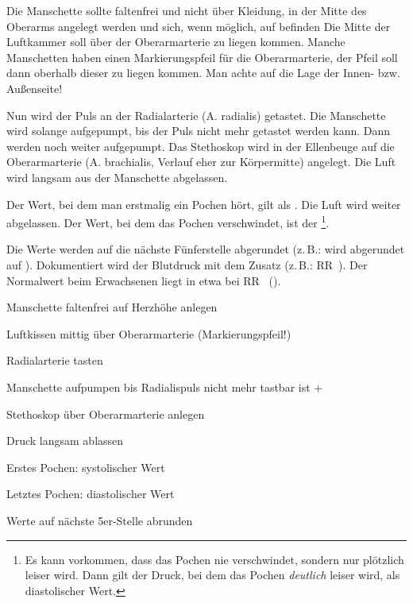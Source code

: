 {%
Die Manschette sollte faltenfrei und nicht über Kleidung, in
der Mitte des Oberarms angelegt werden und sich, wenn
möglich, auf  befinden Die Mitte der Luftkammer soll
über der Oberarmarterie zu liegen kommen. Manche Manschetten
haben einen Markierungspfeil für die Oberarmarterie, der
Pfeil soll dann oberhalb dieser zu liegen kommen. Man achte
auf die Lage der Innen- bzw. Außenseite!

Nun wird der Puls an der Radialarterie (A. radialis)
getastet. Die Manschette wird solange aufgepumpt, bis der
Puls nicht mehr getastet werden kann. Dann werden noch
\MmHg* weiter aufgepumpt. Das Stethoskop wird
in der Ellenbeuge auf die Oberarmarterie (A. brachialis,
Verlauf eher zur Körpermitte) angelegt. Die Luft wird
langsam aus der Manschette abgelassen.

Der Wert, bei dem man erstmalig ein Pochen  hört, gilt als . Die Luft
wird weiter abgelassen. Der Wert, bei dem das Pochen
verschwindet, ist der \footnote{Es
kann vorkommen, dass das Pochen nie verschwindet, sondern
nur plötzlich leiser wird. Dann gilt der Druck, bei dem das
Pochen \emph{deutlich} leiser wird, als diastolischer
Wert.}. \cite{FamPropAeGruFert2012}

Die
Werte werden auf die nächste Fünferstelle abgerundet
(z.\,B.:
 wird abgerundet auf ).
Dokumentiert wird der Blutdruck mit dem Zusatz  (z.\,B.:
RR~). Der Normalwert beim Erwachsenen liegt
in etwa bei RR~
().
}{
\begin{compactenum}
  \item Manschette faltenfrei auf Herzhöhe anlegen
  \item Luftkissen  mittig über Oberarmarterie
  (Markierungspfeil!)
  \item Radialarterie tasten
  \item Manschette aufpumpen bis Radialispuls nicht mehr
  tastbar ist +~\,\MmHg
  \item Stethoskop über Oberarmarterie anlegen
  \item Druck langsam ablassen
  \item Erstes Pochen: systolischer Wert
  \item Letztes Pochen: diastolischer Wert
  \item Werte auf nächste 5er-Stelle abrunden
\end{compactenum}

}{}{}{}





